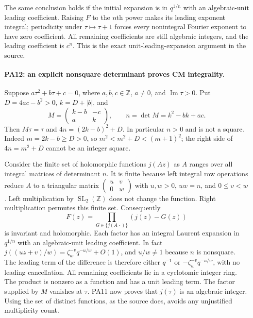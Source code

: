 The same conclusion holds if the initial expansion is in
$q^{1/n}$ with an algebraic-unit leading coefficient. Raising
$F$ to the $n$th power makes its leading exponent integral;
periodicity under $\tau\mapsto\tau+1$ forces every nonintegral
Fourier exponent to have zero coefficient. All remaining
coefficients are still algebraic integers, and the leading
coefficient is $c^n$. This is the exact unit-leading-expansion
argument in the source.

\paragraph{PA12: an explicit nonsquare determinant proves CM integrality.}
Suppose $a\tau^2+b\tau+c=0$, where $a,b,c\in\mathbb Z$,
$a\ne0$, and $\operatorname{Im}\tau>0$. Put
$D=4ac-b^2>0$, $k=D+|b|$, and
\[
 M=\begin{pmatrix}k-b&-c\\a&k\end{pmatrix},\qquad
 n=\det M=k^2-bk+ac.
                                                               \tag{PA.24}
\]
Then $M\tau=\tau$ and
$4n=(2k-b)^2+D$. In particular $n>0$ and is not a square.
Indeed $m=2k-b\ge D>0$, so
$m^2<m^2+D<(m+1)^2$; the right side of $4n=m^2+D$
cannot be an integer square.

Consider the finite set of holomorphic functions $j(Az)$ as
$A$ ranges over all integral matrices of determinant $n$.
It is finite because left integral row operations reduce $A$
to a triangular matrix
$\left(\begin{smallmatrix}u&v\\0&w\end{smallmatrix}\right)$
with $u,w>0$, $uw=n$, and $0\le v<w$. Left multiplication by
$\operatorname{SL}_2(\mathbb Z)$ does not change the function.
Right multiplication permutes this finite set. Consequently
\[
             F(z)=\prod_{G\in\{j(A\,\cdot)\}}(j(z)-G(z))
                                                               \tag{PA.25}
\]
is invariant and holomorphic. Each factor has an integral
Laurent expansion in $q^{1/n}$ with an algebraic-unit leading
coefficient. In fact
$j((uz+v)/w)=\zeta_w^{-v}q^{-u/w}+O(1)$, and
$u/w\ne1$ because $n$ is nonsquare. The leading term of the
difference is therefore either $q^{-1}$ or
$-\zeta_w^{-v}q^{-u/w}$, with no leading cancellation.
All remaining coefficients lie in a cyclotomic integer ring.
The product is nonzero as a function and has a unit leading
term. The factor supplied by $M$ vanishes at $\tau$.
PA11 now proves that $j(\tau)$ is an algebraic integer.
Using the set of distinct functions, as the source does, avoids
any unjustified multiplicity count.

